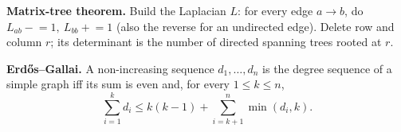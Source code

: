 \begingroup\small
\textbf{Matrix-tree theorem.} Build the Laplacian $L$: for every edge
$a\to b$, do $L_{ab}\mathrel{-}=1,\ L_{bb}\mathrel{+}=1$ (also the reverse
for an undirected edge). Delete row and column $r$; its determinant is the
number of directed spanning trees rooted at $r$.

\textbf{Erd\H{o}s--Gallai.} A non-increasing sequence
$d_1,\ldots,d_n$ is the degree sequence of a simple graph iff its sum is even
and, for every $1\le k\le n$,
\[
 \sum_{i=1}^{k}d_i\le k(k-1)+\sum_{i=k+1}^{n}\min(d_i,k).
\]
\endgroup
